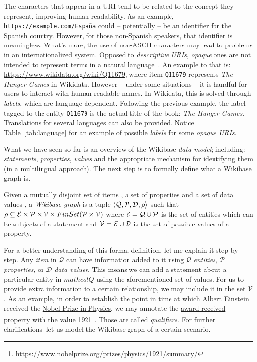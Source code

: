 The characters that appear in a URI tend to be related to the concept they represent, improving human-readability. As an example, \texttt{https://example.com/España} could -- potentially -- be an identifier for the Spanish country. However, for those non-Spanish speakers, that identifier is meaningless. What's more, the use of non-ASCII characters may lead to problems in an internationalized system. Opposed to \textit{descriptive URIs}, \textit{opaque} ones are not intended to represent terms in a natural language~\cite{LabraGayo2015MultilingualLD}. An example to that is: \url{https://www.wikidata.org/wiki/Q11679}, where item \texttt{Q11679} represents \textit{The Hunger Games} in Wikidata. However -- under some situations -- it is handful for users to interact with human-readable names. In Wikidata, this is solved through \textit{labels}, which are language-dependent. Following the previous example, the label tagged to the entity \texttt{Q11679} is the actual title of the book: \textit{The Hunger Games}. Translations for several languages can also be provided. Notice Table~\ref{tab:language} for an example of possible \textit{labels} for some \textit{opaque URIs}.

What we have seen so far is an overview of the Wikibase \textit{data model}; including: \textit{statements}, \textit{properties}, \textit{values} and the appropriate mechanism for identifying them (in a multilingual approach). The next step is to formally define what a Wikibase graph is.

\begin{definition}
    Given a mutually disjoint set of items \ItemSet{}, a set of properties \PropSet{} and a set of data values \DataValueSet{}, a \emph{Wikibase graph} is a tuple $\langle\mathcal{Q},\mathcal{P},\mathcal{D},\rho\rangle$ such that $\rho\subseteq\mathcal{E}\times\mathcal{P}\times\mathcal{V}\times FinSet(\mathcal{P}\times\mathcal{V})$ where $\mathcal{E}=\mathcal{Q}\cup\mathcal{P}$ is the set of entities which can be subjects of a statement and $\mathcal{V}=\mathcal{E}\cup\mathcal{D}$ is the set of possible values of a property.
\end{definition}

For a better understanding of this formal definition, let me explain it step-by-step. Any \textit{item} in $\mathcal{Q}$ can have information added to it using $\mathcal{Q}$ \textit{entities}, $\mathcal{P}$ \textit{properties}, or $\mathcal{D}$ \textit{data values}. This means we can add a statement about a particular entity in $mathcal{Q}$ using the aforementioned set of values. For us to provide extra information to a certain relationship, we may include it in the set $\mathcal{V}$. As an example, in order to establish the \href{https://www.wikidata.org/wiki/Property:P585}{point in time} at which \href{https://www.wikidata.org/wiki/Q937} {Albert Einstein} received the \href{https://www.wikidata.org/wiki/Q38104}{Nobel Prize in Physics}, we may annotate the \href{https://www.wikidata.org/wiki/Property:P166}{award received} property with the value 1921\footnote{\url{https://www.nobelprize.org/prizes/physics/1921/summary/}}. Those are called \textit{qualifiers}. For further clarifications, let us model the Wikibase graph of a certain scenario.

